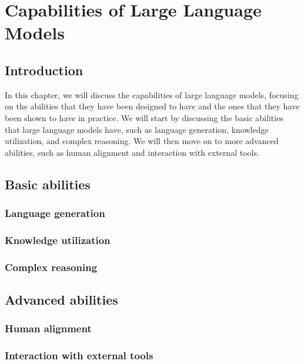
\chapter{Capabilities of Large Language Models}
\label{ch:capabilities}

\section{Introduction}
\label{sec:ch3-introduction}

In this chapter, we will discuss the capabilities of large language models, focusing on the abilities that they have been designed to have and the ones that they have been shown to have in practice.
We will start by discussing the basic abilities that large language models have, such as language generation, knowledge utilization, and complex reasoning.
We will then move on to more advanced abilities, such as human alignment and interaction with external tools.

\section{Basic abilities}
\label{sec:basic-abilities}

\subsection{Language generation}
\label{subsec:language-generation}

\subsection{Knowledge utilization}
\label{subsec:knowledge-utilization}

\subsection{Complex reasoning}
\label{subsec:complex-reasoning}

\section{Advanced abilities}
\label{sec:advanced-abilities}

\subsection{Human alignment}
\label{subsec:human-alignment}

\subsection{Interaction with external tools}
\label{subsec:interaction-with-external-tools}
